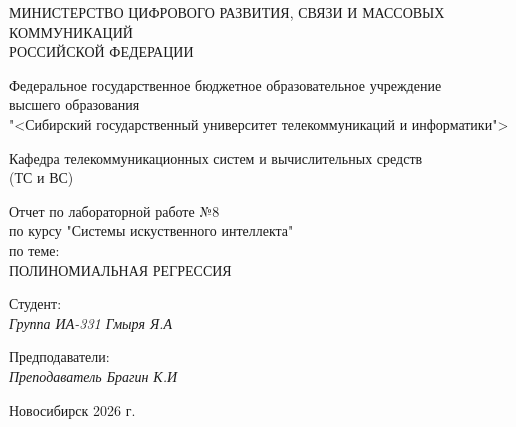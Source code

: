 \thispagestyle{empty}

\begin{center}
    МИНИСТЕРСТВО ЦИФРОВОГО РАЗВИТИЯ, СВЯЗИ И МАССОВЫХ КОММУНИКАЦИЙ \\ РОССИЙСКОЙ ФЕДЕРАЦИИ

    \vspace{20pt}

    Федеральное государственное бюджетное образовательное учреждение  \\  высшего образования \\
    "<Сибирский государственный университет телекоммуникаций и информатики"> \\

    \vspace{20pt}

    Кафедра телекоммуникационных систем и вычислительных средств \\  (ТС и ВС)
\end{center}

\vfill

\begin{center}
    Отчет по лабораторной работе №8 \\  
    по курсу "Системы искуственного интеллекта" \\
    \vspace{20pt}
    по теме: \\
    \uppercase{ ПОЛИНОМИАЛЬНАЯ РЕГРЕССИЯ}
\end{center}

\vfill

    \noindent Студент: \\
    \textit{Группа ИА-331 \hfill Гмыря Я.А} 

    \vspace{20pt}
 
    \noindent Предподаватели: \\
    \textit{Преподаватель \hfill Брагин К.И} \\
\vfill

\begin{center}
    Новосибирск 2026 г.
\end{center}